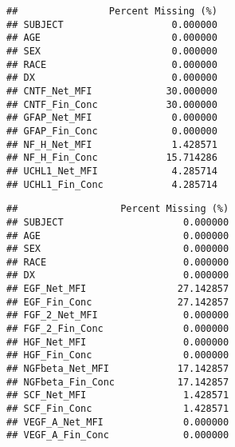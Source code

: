 \documentclass[]{article}
\newenvironment{Shaded}{\begin{snugshade}}{\end{snugshade}}
\newcommand{\CommentTok}[1]{\textcolor[rgb]{0.56,0.35,0.01}{\textit{#1}}}
\newcommand{\ControlFlowTok}[1]{\textcolor[rgb]{0.13,0.29,0.53}{\textbf{#1}}}
\newcommand{\DecValTok}[1]{\textcolor[rgb]{0.00,0.00,0.81}{#1}}
\newcommand{\KeywordTok}[1]{\textcolor[rgb]{0.13,0.29,0.53}{\textbf{#1}}}
\newcommand{\NormalTok}[1]{#1}
\newcommand{\OperatorTok}[1]{\textcolor[rgb]{0.81,0.36,0.00}{\textbf{#1}}}
\newcommand{\StringTok}[1]{\textcolor[rgb]{0.31,0.60,0.02}{#1}}
\begin{document}
\begin{Shaded}
\end{Shaded}

\begin{verbatim}
##                Percent Missing (%)
## SUBJECT                   0.000000
## AGE                       0.000000
## SEX                       0.000000
## RACE                      0.000000
## DX                        0.000000
## CNTF_Net_MFI             30.000000
## CNTF_Fin_Conc            30.000000
## GFAP_Net_MFI              0.000000
## GFAP_Fin_Conc             0.000000
## NF_H_Net_MFI              1.428571
## NF_H_Fin_Conc            15.714286
## UCHL1_Net_MFI             4.285714
## UCHL1_Fin_Conc            4.285714
\end{verbatim}

\begin{Shaded}
\end{Shaded}

\begin{verbatim}
##                  Percent Missing (%)
## SUBJECT                     0.000000
## AGE                         0.000000
## SEX                         0.000000
## RACE                        0.000000
## DX                          0.000000
## EGF_Net_MFI                27.142857
## EGF_Fin_Conc               27.142857
## FGF_2_Net_MFI               0.000000
## FGF_2_Fin_Conc              0.000000
## HGF_Net_MFI                 0.000000
## HGF_Fin_Conc                0.000000
## NGFbeta_Net_MFI            17.142857
## NGFbeta_Fin_Conc           17.142857
## SCF_Net_MFI                 1.428571
## SCF_Fin_Conc                1.428571
## VEGF_A_Net_MFI              0.000000
## VEGF_A_Fin_Conc             0.000000
\end{verbatim}
\end{document}
